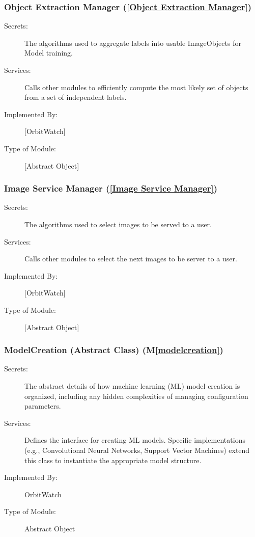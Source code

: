 \documentclass[12pt, titlepage]{article}
\newcommand{\mref}[1]{M\ref{#1}}
\begin{document}
\subsubsection{Object Extraction Manager (\ref{Object Extraction Manager})}
\begin{description}
\item[Secrets:] The algorithms used to aggregate labels into usable ImageObjects for Model training.
\item[Services:] Calls other modules to efficiently compute the most likely set of objects from a set of independent labels.
\item[Implemented By:] [OrbitWatch]
\item[Type of Module:] [Abstract Object]
\end{description}

\subsubsection{Image Service Manager (\ref{Image Service Manager})}
\begin{description}
\item[Secrets:] The algorithms used to select images to be served to a user.
\item[Services:] Calls other modules to select the next images to be server to a user.
\item[Implemented By:] [OrbitWatch]
\item[Type of Module:] [Abstract Object]
\end{description}

\subsubsection{ModelCreation (Abstract Class) (\mref{modelcreation})}
\begin{description}
  \item[Secrets:] 
    The abstract details of how machine learning (ML) model creation is organized,
    including any hidden complexities of managing configuration parameters.
  \item[Services:] 
    Defines the interface for creating ML models. Specific implementations 
    (e.g., Convolutional Neural Networks, Support Vector Machines) extend this class 
    to instantiate the appropriate model structure.
  \item[Implemented By:] 
    OrbitWatch
  \item[Type of Module:] 
    Abstract Object
\end{description}
\end{document}

